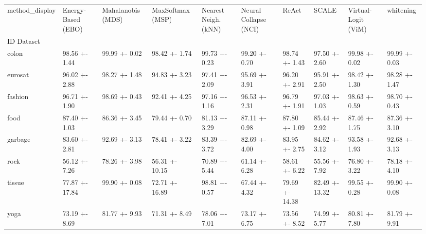 \begin{tabular}{llllllllll}
\toprule
method_display & Energy-Based (EBO) & Mahalanobis (MDS) & MaxSoftmax (MSP) & Nearest Neigh. (kNN) & Neural Collapse (NCI) & ReAct & SCALE & Virtual-Logit (ViM) & whitening \\
ID Dataset &  &  &  &  &  &  &  &  &  \\
\midrule
colon & 98.56 +- 1.44 & 99.99 +- 0.02 & 98.42 +- 1.74 & 99.73 +- 0.23 & 99.20 +- 0.70 & 98.74 +- 1.43 & 97.50 +- 2.60 & 99.98 +- 0.02 & 99.99 +- 0.03 \\
eurosat & 96.02 +- 2.88 & 98.27 +- 1.48 & 94.83 +- 3.23 & 97.41 +- 2.09 & 95.69 +- 3.91 & 96.20 +- 2.91 & 95.91 +- 2.50 & 98.42 +- 1.30 & 98.28 +- 1.47 \\
fashion & 96.71 +- 1.90 & 98.69 +- 0.43 & 92.41 +- 4.25 & 97.16 +- 1.16 & 96.53 +- 2.31 & 96.79 +- 1.91 & 97.03 +- 1.03 & 98.63 +- 0.59 & 98.70 +- 0.43 \\
food & 87.40 +- 1.03 & 86.36 +- 3.45 & 79.44 +- 0.70 & 81.13 +- 3.29 & 87.11 +- 0.98 & 87.80 +- 1.09 & 85.44 +- 2.92 & 87.46 +- 1.75 & 87.36 +- 3.10 \\
garbage & 83.60 +- 2.81 & 92.69 +- 3.13 & 78.41 +- 3.22 & 83.39 +- 3.72 & 82.69 +- 4.00 & 83.95 +- 2.75 & 84.62 +- 3.12 & 93.58 +- 1.93 & 92.68 +- 3.13 \\
rock & 56.12 +- 7.26 & 78.26 +- 3.98 & 56.31 +- 10.15 & 70.89 +- 5.44 & 61.14 +- 6.28 & 58.61 +- 6.22 & 55.56 +- 7.92 & 76.80 +- 3.22 & 78.18 +- 4.10 \\
tissue & 77.87 +- 17.84 & 99.90 +- 0.08 & 72.71 +- 16.89 & 98.81 +- 0.57 & 67.44 +- 4.32 & 79.69 +- 14.38 & 82.49 +- 13.32 & 99.55 +- 0.28 & 99.90 +- 0.08 \\
yoga & 73.19 +- 8.69 & 81.77 +- 9.93 & 71.31 +- 8.49 & 78.06 +- 7.01 & 73.17 +- 6.75 & 73.56 +- 8.52 & 74.99 +- 5.77 & 80.81 +- 7.80 & 81.79 +- 9.91 \\
\bottomrule
\end{tabular}

